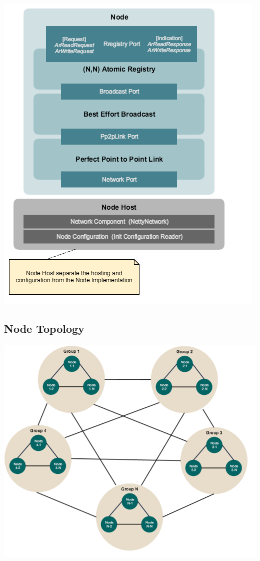 \documentclass[a4paper, 11pt]{article}
\begin{document}
{\centering\includegraphics[scale = 0.5]{./images/design_overview.png}\par}

\subsection{Node Topology}
{\centering\includegraphics[scale = 0.6]{./images/node_setup.png}\par}
\end{document}
